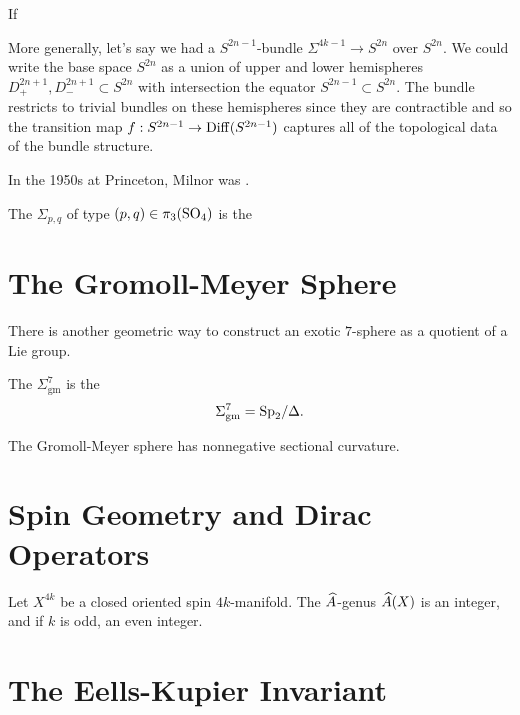 If


More generally, let's say we had a $S^{2n-1}$-bundle $\Sigma^{4k-1} \to S^{2n}$ over $S^{2n}$. We could write the base space $S^{2n}$ as a union of upper and lower hemispheres $D^{2n+1}_+, D^{2n+1}_-\subset S^{2n}$ with intersection the equator $S^{2n-1}\subset S^{2n}$. The bundle restricts to trivial bundles on these hemispheres since they are contractible and so the transition map $f : S^{2n-1} \to \operatorname{Diff}(S^{2n-1})$ captures all of the topological data of the bundle structure.

\begin{historicalremark*}
  In the 1950s at Princeton, Milnor was \cite{milnor2000exotic}. 
\end{historicalremark*}


\begin{definition}
	The  $\Sigma_{p,q}$ of type $(p,q)\in \pi_3({\operatorname{SO}}_4)$ is the
\end{definition}

\section{The Gromoll-Meyer Sphere}

There is another geometric way to construct an exotic $7$-sphere as a quotient of a Lie group.

\begin{definition}
	The  $\Sigma_{\mathrm{gm}}^7$ is the 
	\[
      \Sigma_{\mathrm{gm}}^7 = {\operatorname{Sp}}_2/\Delta.
	\]
\end{definition}

\begin{theorem}
  The Gromoll-Meyer sphere has nonnegative sectional curvature.
\end{theorem}

\section{Spin Geometry and Dirac Operators}

\begin{theorem}
  Let $X^{4k}$ be a closed oriented spin $4k$-manifold. The $\widehat{A}$-genus $\widehat{A}(X)$ is an integer, and if $k$ is odd, an even integer.
\end{theorem}

\section{The Eells-Kupier Invariant}

